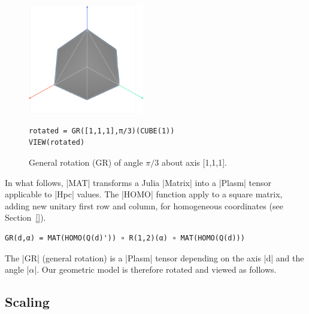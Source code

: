 \begin{figure}[htbp] %
\begin{minipage}[c]{0.35\textwidth}
   \includegraphics[width=2in]{chapter-04/figs/GRcube} 
\end{minipage}
\hfill
\begin{minipage}[c]{0.55\textwidth}
\begin{lstlisting}[language=JuliaLocal, style=julia, mathescape=true]
rotated = GR([1,1,1],π/3)(CUBE(1))
VIEW(rotated)
\end{lstlisting}
\caption{General rotation (GR) of angle $\pi/3$ about axis [1,1,1]. }
\end{minipage}
\end{figure}


\begin{coding}
In what follows, |MAT| transforms a Julia |Matrix| into a |Plasm| tensor applicable to |Hpc| values. 
The |HOMO| function apply to  a square matrix, adding new unitary first row and column, for homogeneous coordinates (see Section~\ref{}).  
\begin{lstlisting}[language=JuliaLocal, style=julia, mathescape=true]
GR(d,α) = MAT(HOMO(Q(d)')) ∘ R(1,2)(α) ∘ MAT(HOMO(Q(d)))
\end{lstlisting}
The |GR| (general rotation) is a |Plasm| tensor depending on the axis |d| and the angle |$\alpha$|. 
Our geometric model is therefore rotated and viewed as follows.
\end{coding}



\subsection*{Scaling}\label{sect:4-2-2}

